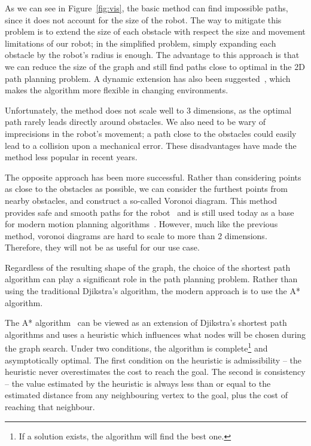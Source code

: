 
As we can see in Figure~\ref{fig:vis}, the basic method can find impossible paths, since it does not account for the size of the robot. The way to mitigate this problem is to extend the size of each obstacle with respect the size and movement limitations of our robot; in the simplified problem, simply expanding each obstacle by the robot's radius is enough. The advantage to this approach is that we can reduce the size of the graph and still find paths close to optimal in the 2D path planning problem. A dynamic extension has also been suggested~\cite{DVG}, which makes the algorithm more flexible in changing environments.

Unfortunately, the method does not scale well to 3 dimensions, as the optimal path rarely leads directly around obstacles. We also need to be wary of imprecisions in the robot's movement; a path close to the obstacles could easily lead to a collision upon a mechanical error. These disadvantages have made the method less popular in recent years.

The opposite approach has been more successful. Rather than considering points as close to the obstacles as possible, we can consider the furthest points from nearby obstacles, and construct a so-called Voronoi diagram. This method provides safe and smooth paths for the robot~\cite{voronoi} and is still used today as a base for modern motion planning algorithms~\cite{voronoi2}. However, much like the previous method, voronoi diagrams are hard to scale to more than 2 dimensions. Therefore, they will not be as useful for our use case.

Regardless of the resulting shape of the graph, the choice of the shortest path algorithm can play a significant role in the path planning problem. Rather than using the traditional Djikstra's algorithm, the modern approach is to use the A* algorithm.

The A* algorithm~\cite{ai_modern} can be viewed as an extension of Djikstra's shortest path algorithms and uses a heuristic which influences what nodes will be chosen during the graph search. Under two conditions, the algorithm is complete\footnote{If a solution exists, the algorithm will find the best one.} and asymptotically optimal. The first condition on the heuristic is admissibility -- the heuristic never overestimates the cost to reach the goal. The second is consistency -- the value estimated by the heuristic is always less than or equal to the estimated distance from any neighbouring vertex to the goal, plus the cost of reaching that neighbour.

